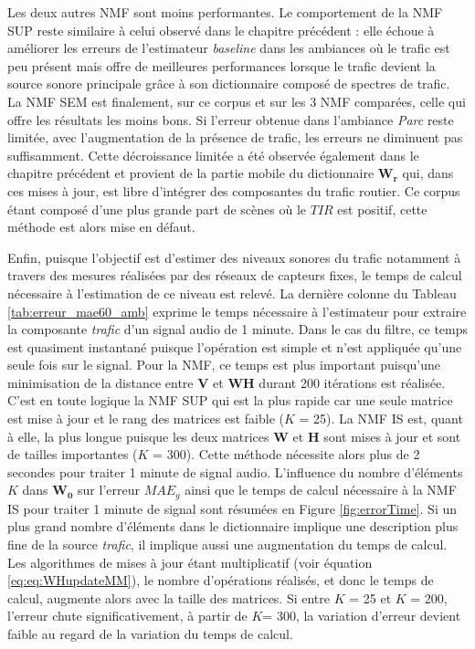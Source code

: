 Les deux autres NMF sont moins performantes.
Le comportement de la NMF SUP reste similaire à celui observé dans le chapitre précédent : elle échoue à améliorer les erreurs de l'estimateur \textit{baseline} dans les ambiances où le trafic est peu présent mais offre de meilleures performances lorsque le trafic devient la source sonore principale grâce à son dictionnaire composé de spectres de trafic.
La NMF SEM est finalement, sur ce corpus et sur les 3 NMF comparées, celle qui offre les résultats les moins bons. Si l'erreur obtenue dans l'ambiance \textit{Parc} reste limitée, avec l'augmentation de la présence de trafic, les erreurs ne diminuent pas suffisamment. Cette décroissance limitée a été observée également dans le chapitre précédent et provient de la partie mobile du dictionnaire $\mathbf{W_r}$ qui, dans ces mises à jour, est libre d'intégrer des composantes du trafic routier. Ce corpus étant composé d'une plus grande part de scènes où le $TIR$ est positif, cette méthode est alors mise en défaut. 

Enfin, puisque l'objectif est d'estimer des niveaux sonores du trafic notamment à travers des mesures réalisées par des réseaux de capteurs fixes, le temps de calcul nécessaire à l'estimation de ce niveau est relevé. La dernière colonne du Tableau \ref{tab:erreur_mae60_amb} exprime le temps nécessaire à l'estimateur pour extraire la composante \textit{trafic} d'un signal audio de 1 minute. Dans le cas du filtre, ce temps est quasiment instantané puisque l'opération est simple et n'est appliquée qu'une seule fois sur le signal.
Pour la NMF, ce temps est plus important puisqu'une minimisation de la distance entre $\mathbf{V}$ et $\mathbf{WH}$ durant 200 itérations est réalisée. C'est en toute logique la NMF SUP qui est la plus rapide car une seule matrice est mise à jour et le rang des matrices est faible ($K$ = 25).
La NMF IS est, quant à elle, la plus longue puisque les deux matrices $\mathbf{W}$ et $\mathbf{H}$ sont mises à jour et sont de tailles importantes ($K$ = 300). Cette méthode nécessite alors plus de 2 secondes pour traiter 1 minute de signal audio. L'influence du nombre d'éléments $K$ dans $\mathbf{W_0}$ sur l'erreur $MAE_g$ ainsi que le temps de calcul nécessaire à la NMF IS pour traiter 1 minute de signal sont résumées en Figure \ref{fig:errorTime}. Si un plus grand nombre d'éléments dans le dictionnaire implique une description plus fine de la source \textit{trafic}, il implique aussi une augmentation du temps de calcul. Les algorithmes de mises à jour étant multiplicatif (voir équation \ref{eq:eq:WHupdateMM}), le nombre d'opérations réalisés, et donc le temps de calcul, augmente alors avec la taille des matrices. Si entre $K$ = 25 et $K$ = 200, l'erreur chute significativement, à partir de $K$= 300, la variation d'erreur devient faible au regard de la variation du temps de calcul. 

